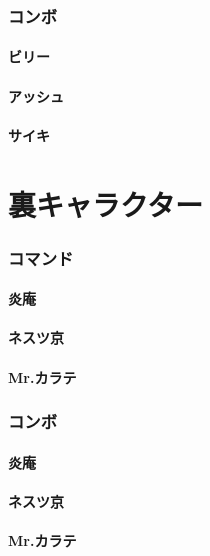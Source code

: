 \documentclass[a4j,11pt]{jarticle}
\begin{document}
\section{コンボ}
\subsection{ビリー}
\subsection{アッシュ}
\subsection{サイキ}
\part{裏キャラクター}%
\section{コマンド}
\subsection{炎庵}
\subsection{ネスツ京}
\subsection{Mr.カラテ}
\section{コンボ}
\subsection{炎庵}
\subsection{ネスツ京}
\subsection{Mr.カラテ}
\end{document}
